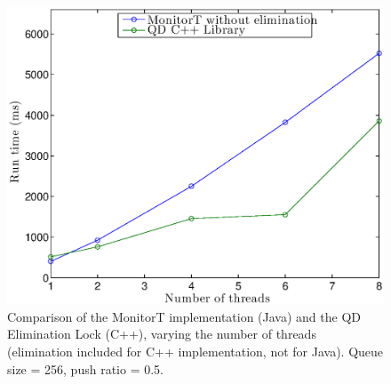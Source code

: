 \begin{figure}[]
\centering
\includegraphics[width=.75\textwidth]{figs/02_TimeVsThreads_cppElim_javaNoElim.eps}
\caption[]{Comparison of the MonitorT implementation (Java) and the QD Elimination Lock (C++), varying the number of threads (elimination included for C++ implementation, not for Java). Queue size = 256, push ratio = 0.5.}
\label{fig:fig02}
\end{figure}

